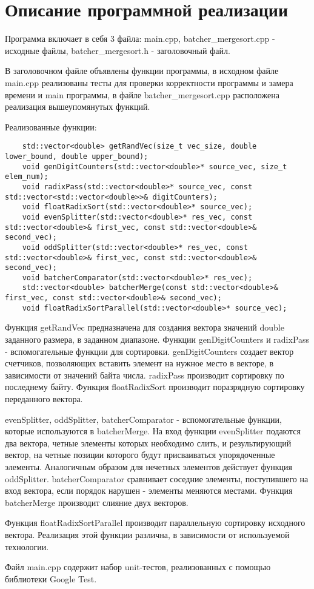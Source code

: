 \documentclass{report}
\begin{document}
\section*{Описание программной реализации}
\par Программа включает в себя 3 файла: main.cpp, batcher\_mergesort.cpp - исходные файлы, batcher\_mergesort.h - заголовочный файл.
\par В заголовочном файле объявлены функции программы, в исходном файле main.cpp реализованы тесты для проверки корректности программы и замера времени и main программы, в файле batcher\_mergesort.cpp расположена реализация вышеупомянутых функций. 
\par Реализованные функции:
\begin{lstlisting}
    std::vector<double> getRandVec(size_t vec_size, double lower_bound, double upper_bound);
    void genDigitCounters(std::vector<double>* source_vec, size_t elem_num);
    void radixPass(std::vector<double>* source_vec, const std::vector<std::vector<double>>& digitCounters);
    void floatRadixSort(std::vector<double>* source_vec);
    void evenSplitter(std::vector<double>* res_vec, const std::vector<double>& first_vec, const std::vector<double>& second_vec);
    void oddSplitter(std::vector<double>* res_vec, const std::vector<double>& first_vec, const std::vector<double>& second_vec);
    void batcherComparator(std::vector<double>* res_vec);
    std::vector<double> batcherMerge(const std::vector<double>& first_vec, const std::vector<double>& second_vec);
    void floatRadixSortParallel(std::vector<double>* source_vec);
\end{lstlisting}
\par Функция getRandVec предназначена для создания вектора значений double заданного размера, в заданном диапазоне. Функции genDigitCounters и radixPass - вспомогательные функции для сортировки. genDigitCounters создает вектор счетчиков, позволяющих вставить элемент на нужное место в векторе, в зависимости от значений байта числа. radixPass производит сортировку по последнему байту. Функция floatRadixSort производит поразрядную сортировку переданного вектора.
\par evenSplitter, oddSplitter, batcherComparator - вспомогательные функции, которые используются в batcherMerge. На вход функции evenSplitter подаются два вектора, четные элементы которых необходимо слить, и результирующий вектор, на четные позиции которого будут присваиваться упорядоченные элементы. Аналогичным образом для нечетных элементов действует функция oddSplitter. batcherComparator сравнивает соседние элементы, поступившего на вход вектора, если порядок нарушен - элементы меняются местами. Функция batcherMerge производит слияние двух векторов.
\par Функция floatRadixSortParallel производит параллельную сортировку исходного вектора. Реализация этой функции различна, в зависимости от используемой технологии.
\par Файл main.cpp содержит набор unit-тестов, реализованных с помощью библиотеки Google Test.
\newpage
\end{document}
